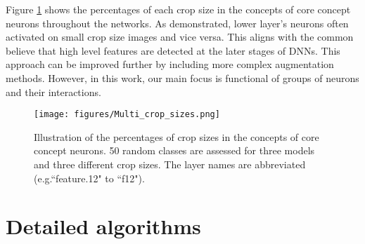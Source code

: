 Figure \ref{fig:crop_sizes} shows the percentages of each crop size in the concepts of core concept neurons throughout the networks. As demonstrated, lower layer's neurons often activated on small crop size images and vice versa. This aligns with the common believe that high level features are detected at the later stages of DNNs. This approach can be improved further by including more complex augmentation methods. However, in this work, our main focus is functional of groups of neurons and their interactions.
\begin{figure}[tb] 
\vspace{-3mm}
\begin{center}
\texttt{[image: figures/Multi\_crop\_sizes.png]} 
\end{center}
\vspace{-3mm}
\caption{Illustration of the percentages of crop sizes in the concepts of core concept neurons. 50 random classes are assessed for three models and three different crop sizes. The layer names are abbreviated (e.g.``feature.12" to ``f12").}\label{fig:crop_sizes}
\end{figure}

\section{Detailed algorithms}
\label{sec:main_algo}

